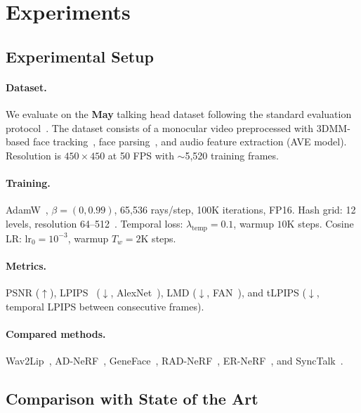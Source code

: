 \documentclass[10pt,twocolumn,letterpaper]{article}
\begin{document}
\section{Experiments}
\label{sec:experiments}

\subsection{Experimental Setup}
\label{sec:setup}

\paragraph{Dataset.}
We evaluate on the \textbf{May} talking head dataset following the standard evaluation protocol~\cite{peng2024synctalk}.
The dataset consists of a monocular video preprocessed with 3DMM-based face tracking~\cite{blanz1999morphable,deng2019accurate}, face parsing~\cite{yu2018bisenet}, and audio feature extraction (AVE model).
Resolution is $450 \times 450$ at 50 FPS with ${\sim}$5,520 training frames.

\paragraph{Training.}
AdamW~\cite{loshchilov2019adamw}, $\beta{=}(0, 0.99)$, 65,536 rays/step, 100K iterations, FP16.
Hash grid: 12 levels, resolution 64--512~\cite{mueller2022instant}.
Temporal loss: $\lambda_{\text{temp}}{=}0.1$, warmup $10$K steps.
Cosine LR: $\text{lr}_0{=}10^{-3}$, warmup $T_w{=}2$K steps.

\paragraph{Metrics.}
PSNR ($\uparrow$), LPIPS~\cite{zhang2018lpips} ($\downarrow$, AlexNet~\cite{krizhevsky2012alexnet}), LMD ($\downarrow$, FAN~\cite{bulat2017fan}), and tLPIPS ($\downarrow$, temporal LPIPS between consecutive frames).

\paragraph{Compared methods.}
Wav2Lip~\cite{prajwal2020wav2lip}, AD-NeRF~\cite{guo2021adnerf}, GeneFace~\cite{ye2023geneface}, RAD-NeRF~\cite{tang2022radnerf}, ER-NeRF~\cite{li2023ernerf}, and SyncTalk~\cite{peng2024synctalk}.


\subsection{Comparison with State of the Art}
\label{sec:results}
\end{document}
